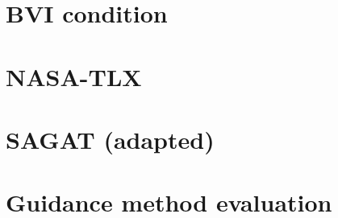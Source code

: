 

\section{BVI condition}
\label{sec:bvi_condition}
\vspace{0.25in}



\section{NASA-TLX}
\label{sec:nasa_tlx}


\pagebreak

\section{SAGAT (adapted)}
\label{apsec:sagat}


\pagebreak

\section{Guidance method evaluation}
\label{sec:guidace_evaluation}

